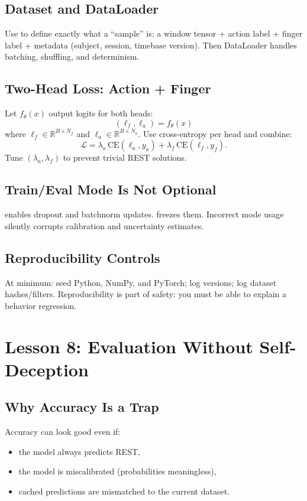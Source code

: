 \documentclass[11pt,openany]{book}
\begin{document}
\section{Dataset and DataLoader}
Use \texttt{} to define exactly what a “sample” is:
a window tensor + action label + finger label + metadata (subject, session, timebase version).
Then DataLoader handles batching, shuffling, and determinism.

\section{Two-Head Loss: Action + Finger}
Let $f_\theta(x)$ output logits for both heads:
\[
(\ell_f, \ell_a) = f_\theta(x)
\]
where $\ell_f \in \mathbb{R}^{B\times N_f}$ and $\ell_a \in \mathbb{R}^{B\times N_a}$.
Use cross-entropy per head and combine:
\[
\mathcal{L} = \lambda_a \,\mathrm{CE}(\ell_a, y_a) + \lambda_f \,\mathrm{CE}(\ell_f, y_f).
\]
Tune $(\lambda_a,\lambda_f)$ to prevent trivial REST solutions.

\section{Train/Eval Mode Is Not Optional}
\texttt{} enables dropout and batchnorm updates.
\texttt{} freezes them.
Incorrect mode usage silently corrupts calibration and uncertainty estimates.

\section{Reproducibility Controls}
At minimum: seed Python, NumPy, and PyTorch; log versions; log dataset hashes/filters.
Reproducibility is part of safety: you must be able to explain a behavior regression.


\chapter{Lesson 8: Evaluation Without Self-Deception}

\section{Why Accuracy Is a Trap}

Accuracy can look good even if:
\begin{itemize}
  \item the model always predicts REST,
  \item the model is miscalibrated (probabilities meaningless),
  \item cached predictions are mismatched to the current dataset.
\end{itemize}
\end{document}
